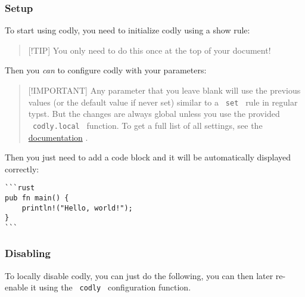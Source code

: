 \subsubsection{Setup}\label{setup}

To start using codly, you need to initialize codly using a show rule:

\begin{Shaded}
\begin{Highlighting}[]
\end{Highlighting}
\end{Shaded}

\begin{quote}
{[}!TIP{]} You only need to do this once at the top of your document!
\end{quote}

Then you \emph{can} to configure codly with your parameters:

\begin{Shaded}
\begin{Highlighting}[]
\NormalTok{  )}
\NormalTok{)}
\end{Highlighting}
\end{Shaded}

\begin{quote}
{[}!IMPORTANT{]} Any parameter that you leave blank will use the
previous values (or the default value if never set) similar to a
\texttt{\ set\ } rule in regular typst. But the changes are always
global unless you use the provided \texttt{\ codly.local\ } function. To
get a full list of all settings, see the
\href{https://raw.githubusercontent.com/Dherse/codly/main/docs.pdf}{documentation}
.
\end{quote}

Then you just need to add a code block and it will be automatically
displayed correctly:

\begin{verbatim}
```rust
pub fn main() {
    println!("Hello, world!");
}
```
\end{verbatim}

\subsubsection{Disabling}\label{disabling}

To locally disable codly, you can just do the following, you can then
later re-enable it using the \texttt{\ codly\ } configuration function.

